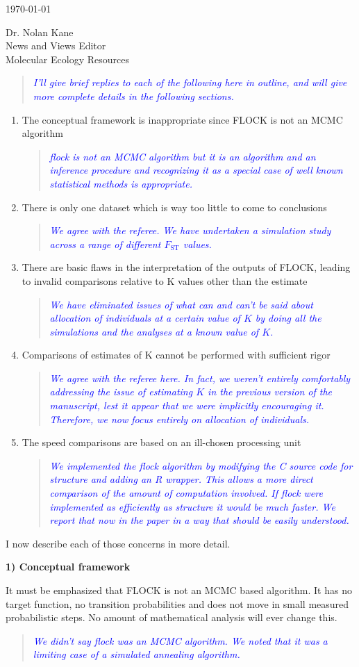 \documentclass[11pt]{letter}
\newcommand{\reply}[1]{\begin{quotation}\small\sl\textcolor{blue}{#1}\end{quotation}}
\begin{document}
\begin{letter}{ \today 

Dr. Nolan Kane\\
News and Views Editor\\
Molecular Ecology Resources \\
}
\reply{I'll give brief replies to each of the following here in outline,
and will give more complete details in the following sections.}
\begin{enumerate}
\item The conceptual framework is inappropriate since FLOCK is not an MCMC algorithm
\reply{{\sc flock} is not an MCMC algorithm but it {\em is} an algorithm and an inference procedure and 
recognizing it as a special case of well known statistical methods is appropriate.}
\item There is only one dataset which is way too little to come to conclusions
\reply{We agree with the referee. We have undertaken a simulation study across a range of different $F_\mathrm{ST}$ values.}
\item There are basic flaws in the interpretation of the outputs of FLOCK, leading to invalid
comparisons relative to K values other than the estimate
\reply{We have eliminated issues of what can and can't be said about allocation of individuals  at a
certain value of $K$ by doing all the simulations and the analyses at a known value of $K$.}
\item Comparisons of estimates of K cannot be performed with sufficient rigor
\reply{We agree with the referee here.  In fact, we weren't entirely comfortably addressing the issue of estimating
$K$ in the previous version of the manuscript, lest it appear that we were implicitly encouraging it. 
Therefore, we now focus entirely on allocation of individuals.}
\item The speed comparisons are based on an ill-chosen processing unit
\reply{We implemented the {\sc flock} algorithm by modifying the C source code for {\sc structure} and
adding an R wrapper.  This allows a more direct comparison of the amount of computation involved.  If 
{\sc flock} were implemented as efficiently as {\sc structure} it would be much faster.  We report that now in the paper in a way that should be easily understood. }
\end{enumerate}

I now describe each of those concerns in more detail.

{\bf 1) Conceptual framework}

It must be emphasized that FLOCK is not an MCMC based algorithm. It has no target function, no transition probabilities and does not move in small measured probabilistic steps. No amount of mathematical analysis will ever change this. 

\reply{We didn't say {\sc flock} was an MCMC algorithm.  We noted that it was a limiting
 case of a simulated annealing algorithm.}


\end{letter}
\end{document}
